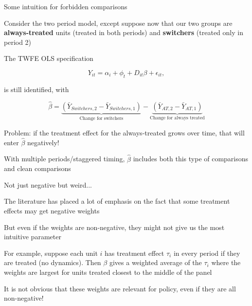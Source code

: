 \documentclass[usenames, dvipsnames, aspectratio = 169, 13pt]{beamer}
\newenvironment{wideitemize}{\itemize\addtolength{\itemsep}{10pt}}{\enditemize}
\begin{document}
\begin{frame}{Some intuition for forbidden comparisons}
\begin{wideitemize}
    \item
    Consider the two period model, except suppose now that our two groups are \textbf{always-treated} units (treated in both periods) and \textbf{switchers} (treated only in period 2)
    
    \item
    The TWFE OLS specification
    
    $$ Y_{it} = \alpha_i + \phi_t + D_{it} \beta  + \epsilon_{it},$$
    
    is still identified, with 
    
    $$\hat\beta =  \underbrace{ \left(\bar{Y}_{Switchers, 2} - \bar{Y}_{Switchers, 1} \right) }_{\text{Change for switchers}} - \underbrace{ \left(\bar{Y}_{AT, 2} - \bar{Y}_{AT, 1} \right) }_{\text{Change for always treated}}  $$
    
    \item
    Problem: if the treatment effect for the always-treated grows over time, that will enter $\hat\beta$ negatively!
    
    \item
    With multiple periods/staggered timing, $\hat\beta$ includes both this type of comparisons and clean comparisons
\end{wideitemize}    
\end{frame}

\begin{frame}{Not just negative but weird...}
    \begin{wideitemize}
        \item
        The literature has placed a lot of emphasis on the fact that some treatment effects may get negative weights
        
        \item
        But even if the weights are non-negative, they might not give us the most intuitive parameter
        
        \item
        For example, suppose each unit $i$ has treatment effect $\tau_i$ in every period if they are treated (no dynamics). Then $\beta$ gives a weighted average of the $\tau_i$ where the weights are largest for units treated closest to the middle of the panel
        
        \item
        It is not obvious that these weights are relevant for policy, even if they are all non-negative!
    \end{wideitemize}
\end{frame}
\end{document}
